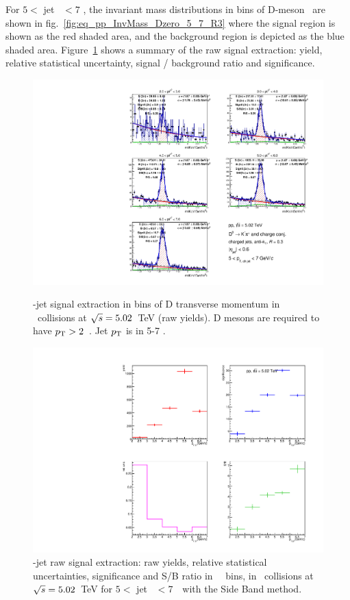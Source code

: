 For $5<$ jet \pt\ $<7$ \GeVc, the invariant mass distributions in bins of D-meson \pt\ are shown in fig.~\ref{fig:eq_pp_InvMass_Dzero_5_7_R3} where  the signal region is shown as the red shaded area, and the background region is depicted as the blue shaded area.
Figure~\ref{fig:eq_pp_signalParams_5_7_R3} shows a summary of the raw signal extraction:
yield, relative statistical uncertainty, signal / background ratio and significance.
\begin{figure}[bth]
\centering
\begin{minipage}{.65\textwidth}
  \centering
\includegraphics[width=\textwidth]{pp_2sig/R3_jetbin_5_7/invMass_pTD2}
\caption{\Dzero-jet signal extraction in bins of D transverse momentum in \pp\ collisions at $\sqrt{s}=5.02$~TeV (raw yields). D mesons are required to have $p_{\rm T}>2$~\GeVc. Jet $p_{\rm T}$ is in 5-7 \GeVc.
}
\label{fig:eq_pp_InvMass_Dzero_5_7_R3}
\end{minipage}%
\begin{minipage}{.4\textwidth}
  \centering
\includegraphics[width=\textwidth]{pp_2sig/R3_jetbin_5_7/signalParams_pTD2}
\caption{%
\Dzero-jet raw signal extraction: raw yields, relative statistical uncertainties, significance and S/B ratio in \Dzero\ \pt\ bins, in \pp\ collisions at $\sqrt{s}=5.02$~TeV for $5<$ jet \pt\ $<7$~\GeVc\ with the Side Band method.
}
\label{fig:eq_pp_signalParams_5_7_R3}
\end{minipage}
\end{figure}
